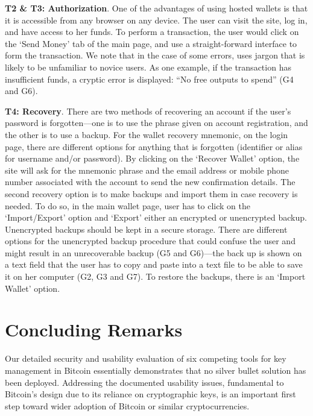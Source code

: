 \textbf{T2 \& T3: Authorization}.
\label{hosted transaction}
One of the advantages of using hosted wallets is that it is accessible from any browser on any device. The user can visit the site, log in, and have access to her funds. To perform a transaction, the user would click on the `Send Money' tab of the main page, and use a straight-forward interface to form the transaction. We note that in the case of some errors, \block uses jargon that is likely to be unfamiliar to novice users. As one example, if the transaction has insufficient funds, a cryptic error is displayed: ``No free outputs to spend'' (G4 and G6).

\textbf{T4: Recovery}.
There are two methods of recovering an account if the user's password is forgotten---one is to use the phrase given on account registration, and the other is to use a backup. For the wallet recovery mnemonic, on the login page, there are different options for anything that is forgotten (identifier or alias for username and/or password). By clicking on the `Recover Wallet' option, the site will ask for the mnemonic phrase and the email address or mobile phone number associated with the account to send the new confirmation details. The second recovery option is to make backups and import them in case recovery is needed. To do so, in the main wallet page, user has to click on the `Import/Export' option and `Export' either an encrypted or unencrypted backup. Unencrypted backups should be kept in a secure storage. There are different options for the unencrypted backup procedure that could confuse the user and might result in an unrecoverable backup (G5 and G6)---the back up is shown on a text field that the user has to copy and paste into a text file to be able to save it on her computer (G2, G3 and G7). To restore the backups, there is an `Import Wallet' option.
 


\section{Concluding Remarks}
Our detailed security and usability evaluation of six competing tools for key management in Bitcoin essentially demonstrates that no silver bullet solution has been deployed. Addressing the documented usability issues, fundamental to Bitcoin's design due to its reliance on cryptographic keys, is an important first step toward wider adoption of Bitcoin or similar cryptocurrencies. 

